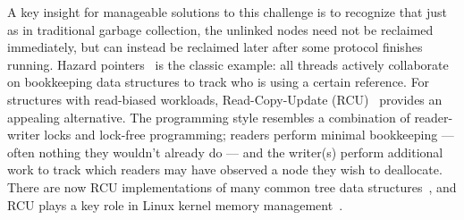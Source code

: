 A key insight for manageable solutions to this challenge is to recognize that just as in traditional garbage collection, the unlinked nodes need not be reclaimed immediately, but can instead be reclaimed later after some protocol finishes running.
Hazard pointers~\cite{Michael:2004:HPS:987524.987595} is the classic example: all threads actively collaborate on bookkeeping data structures to track who is using a certain reference.
For structures with read-biased workloads, Read-Copy-Update (RCU)~\cite{Mckenney:2004:EDD:1048173} provides an appealing alternative.  The programming style resembles a combination of reader-writer locks and lock-free programming; readers perform minimal bookkeeping --- often nothing they wouldn't already do --- and the writer(s) perform additional work to track which readers may have observed a node they wish to deallocate.
There are now RCU implementations of many common tree data structures~\cite{urcu_ieee,Triplett:2011:RSC:2002181.2002192,DBLP:conf/asplos/ClementsKZ12,mc_report,Arbel:2014:CUR:2611462.2611471,Kung:1980:CMB:320613.320619}, and
RCU plays a key role in Linux kernel memory management~\cite{Mckenney01read-copyupdate}.


